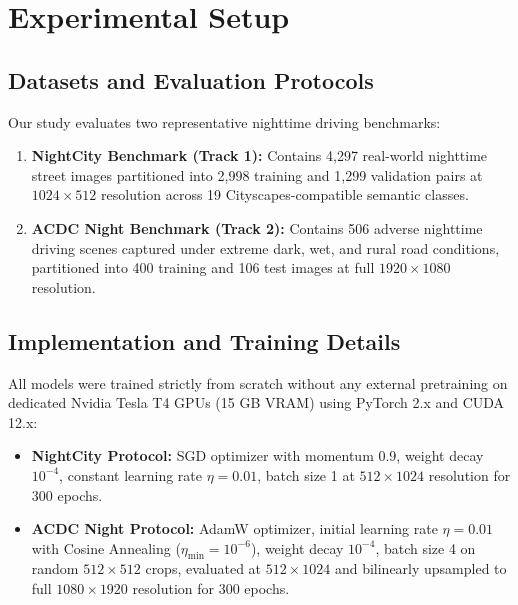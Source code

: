 \documentclass[conference]{IEEEtran}
\begin{document}
\section{Experimental Setup}

\subsection{Datasets and Evaluation Protocols}
Our study evaluates two representative nighttime driving benchmarks:
\begin{enumerate}
    \item \textbf{NightCity Benchmark (Track 1):} Contains 4,297 real-world nighttime street images partitioned into 2,998 training and 1,299 validation pairs at $1024 \times 512$ resolution across 19 Cityscapes-compatible semantic classes.
    \item \textbf{ACDC Night Benchmark (Track 2):} Contains 506 adverse nighttime driving scenes captured under extreme dark, wet, and rural road conditions, partitioned into 400 training and 106 test images at full $1920 \times 1080$ resolution.
\end{enumerate}

\subsection{Implementation and Training Details}
All models were trained strictly from scratch without any external pretraining on dedicated Nvidia Tesla T4 GPUs (15 GB VRAM) using PyTorch 2.x and CUDA 12.x:
\begin{itemize}
    \item \textbf{NightCity Protocol:} SGD optimizer with momentum 0.9, weight decay $10^{-4}$, constant learning rate $\eta = 0.01$, batch size 1 at $512 \times 1024$ resolution for 300 epochs.
    \item \textbf{ACDC Night Protocol:} AdamW optimizer, initial learning rate $\eta = 0.01$ with Cosine Annealing ($\eta_{\text{min}} = 10^{-6}$), weight decay $10^{-4}$, batch size 4 on random $512 \times 512$ crops, evaluated at $512 \times 1024$ and bilinearly upsampled to full $1080 \times 1920$ resolution for 300 epochs.
\end{itemize}
\end{document}

